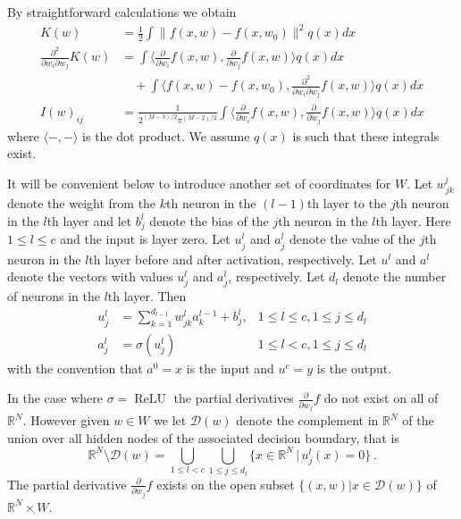 \documentclass{article} %
\begin{document}
By straightforward calculations we obtain
\begin{align}
K(w) &= \tfrac{1}{2} \int \| f(x,w) - f(x,w_0) \|^2 q(x) dx \label{eq:K_nn}\\
\tfrac{\partial^2}{\partial w_i \partial w_j} K(w) &= \int \Big\langle \tfrac{\partial}{\partial w_i} f(x,w), \tfrac{\partial}{\partial w_j} f(x,w) \Big\rangle q(x) dx \nonumber \\
&\quad + \int \Big\langle f(x,w) - f(x,w_0), \tfrac{\partial^2}{\partial w_i \partial w_j} f(x,w) \Big\rangle q(x) dx \label{eq:Hessian}\\
I(w)_{ij} &= \frac{1}{2^{(M-3)/2} \pi^{(M-2)/2}} \int \Big\langle \tfrac{\partial}{\partial w_i} f(x,w), \tfrac{\partial}{\partial w_j} f(x,w) \Big\rangle q(x) dx\label{eq:fisher_relu}
\end{align}
where $\langle -, - \rangle$ is the dot product. We assume $q(x)$ is such that these integrals exist.

It will be convenient below to introduce another set of coordinates for $W$. Let $w_{jk}^{l}$ denote the weight from the $k$th neuron in the $(l-1)$th layer to the $j$th neuron in the $l$th layer and let $b_j^{l}$ denote the bias of the $j$th neuron in the $l$th layer. Here $1 \le l \le c$ and the input is layer zero. Let $u_{j}^{l}$ and $a_{j}^{l}$ denote the value of the $j$th neuron in the $l$th layer before and after activation, respectively. Let $u^{l}$ and $a^{l}$ denote the vectors with values $u_{j}^{l}$ and $a_{j}^{l}$, respectively. Let $d_{l}$ denote the number of neurons in the $l$th layer. Then
\begin{align*}
	u_{j}^{l} &=\sum_{k=1}^{d_{l-1}}w_{jk}^{l}a_{k}^{l-1}+b_{j}^{l}, &1 \le l \le c, 1 \le j \le d_l\\
	a_{j}^{l} &=\sigma(u_{j}^{l}) & 1 \le l < c, 1 \le j \le d_l
\end{align*}
with the convention that $a^0 = x$ is the input and $u^c = y$ is the output.

In the case where $\sigma = \operatorname{ReLU}$ the partial derivatives $\frac{\partial}{\partial w_j} f$ do not exist on all of $\mathbb{R}^N$. However given $w \in W$ we let $\mathcal{D}(w)$ denote the complement in $\mathbb{R}^N$ of the union over all hidden nodes of the associated decision boundary, that is
\[
\mathbb{R}^N \setminus \mathcal{D}(w) = \bigcup_{1 \le l < c} \bigcup_{1 \le j \le d_l} \{ x \in \mathbb{R}^N \,|\, u^l_j(x) = 0 \}\,.
\]
The partial derivative $\frac{\partial}{\partial w_j} f$ exists on the open subset $\{ (x,w) | x \in \mathcal{D}(w) \}$ of $\mathbb{R}^N \times W$. 
\end{document}
